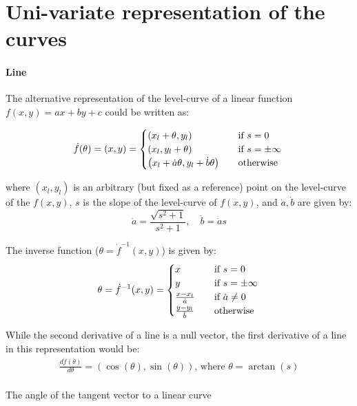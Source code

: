 \section{Uni-variate representation of the curves} \label{app:alternativeRep}

\paragraph{Line}
The alternative representation of the level-curve of a linear function $f(x,y)=ax+by+c$ could be written as:

\[
\dot{f}(\theta) = (x,y) =
\begin{cases}
  \left( x_l + \theta, y_l \right) & \quad \text{if } s = 0\\
  \left( x_l, y_l + \theta \right) & \quad \text{if } s = \pm \infty\\
  \left( x_l + \dot{a}\theta , y_l + \dot{b}\theta \right) & \quad \text{otherwise} \\
\end{cases}\\
\]

where $(x_l,y_l)$ is an arbitrary (but fixed as a reference) point on the level-curve of the $f(x,y)$, $s$ is the slope of the level-curve of $f(x,y)$, and $\dot{a}, \dot{b}$ are given by:
\[
\dot{a} = \frac{\sqrt{ s^2 + 1}}{s^2 + 1}, \quad \dot{b} = \dot{a}s
\]

The inverse function ($\theta = \dot{f}^{-1}(x,y)$) is given by:
\[
\theta = \dot{f}^{-1}(x,y) =
\begin{cases}
  x & \quad \text{if } s = 0\\
  y & \quad \text{if } s = \pm \infty\\
  \frac{x-x_l}{\dot{a}} & \quad \text{if } \dot{a} \neq 0\\
  \frac{y-y_l}{\dot{b}} & \quad \text{otherwise} \\
\end{cases}\\
\]

While the second derivative of a line is a null vector, the first derivative of a line in this representation would be:
\[
\begin{array}{l}
  \frac{d\dot{f}(\theta)}{d\theta} = \left( \cos(\theta) , \sin(\theta) \right) \text{, where } \theta = \arctan(s)\\
\end{array}
\]

The angle of the tangent vector to a linear curve

